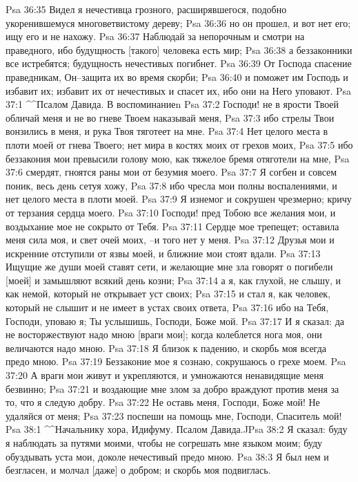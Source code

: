 Psa 36:35  Видел я нечестивца грозного, расширявшегося, подобно укоренившемуся многоветвистому дереву;
Psa 36:36  но он прошел, и вот нет его; ищу его и не нахожу.
Psa 36:37  Наблюдай за непорочным и смотри на праведного, ибо будущность [такого] человека есть мир;
Psa 36:38  а беззаконники все истребятся; будущность нечестивых погибнет.
Psa 36:39  От Господа спасение праведникам, Он--защита их во время скорби;
Psa 36:40  и поможет им Господь и избавит их; избавит их от нечестивых и спасет их, ибо они на Него уповают.
Psa 37:1  ^^Псалом Давида. В воспоминание^^.
Psa 37:2  Господи! не в ярости Твоей обличай меня и не во гневе Твоем наказывай меня,
Psa 37:3  ибо стрелы Твои вонзились в меня, и рука Твоя тяготеет на мне.
Psa 37:4  Нет целого места в плоти моей от гнева Твоего; нет мира в костях моих от грехов моих,
Psa 37:5  ибо беззакония мои превысили голову мою, как тяжелое бремя отяготели на мне,
Psa 37:6  смердят, гноятся раны мои от безумия моего.
Psa 37:7  Я согбен и совсем поник, весь день сетуя хожу,
Psa 37:8  ибо чресла мои полны воспалениями, и нет целого места в плоти моей.
Psa 37:9  Я изнемог и сокрушен чрезмерно; кричу от терзания сердца моего.
Psa 37:10  Господи! пред Тобою все желания мои, и воздыхание мое не сокрыто от Тебя.
Psa 37:11  Сердце мое трепещет; оставила меня сила моя, и свет очей моих, --и того нет у меня.
Psa 37:12  Друзья мои и искренние отступили от язвы моей, и ближние мои стоят вдали.
Psa 37:13  Ищущие же души моей ставят сети, и желающие мне зла говорят о погибели [моей] и замышляют всякий день козни;
Psa 37:14  а я, как глухой, не слышу, и как немой, который не открывает уст своих;
Psa 37:15  и стал я, как человек, который не слышит и не имеет в устах своих ответа,
Psa 37:16  ибо на Тебя, Господи, уповаю я; Ты услышишь, Господи, Боже мой.
Psa 37:17  И я сказал: да не восторжествуют надо мною [враги мои]; когда колеблется нога моя, они величаются надо мною.
Psa 37:18  Я близок к падению, и скорбь моя всегда предо мною.
Psa 37:19  Беззаконие мое я сознаю, сокрушаюсь о грехе моем.
Psa 37:20  А враги мои живут и укрепляются, и умножаются ненавидящие меня безвинно;
Psa 37:21  и воздающие мне злом за добро враждуют против меня за то, что я следую добру.
Psa 37:22  Не оставь меня, Господи, Боже мой! Не удаляйся от меня;
Psa 37:23  поспеши на помощь мне, Господи, Спаситель мой!
Psa 38:1  ^^Начальнику хора, Идифуму. Псалом Давида.^^
Psa 38:2  Я сказал: буду я наблюдать за путями моими, чтобы не согрешать мне языком моим; буду обуздывать уста мои, доколе нечестивый предо мною.
Psa 38:3  Я был нем и безгласен, и молчал [даже] о добром; и скорбь моя подвиглась.
